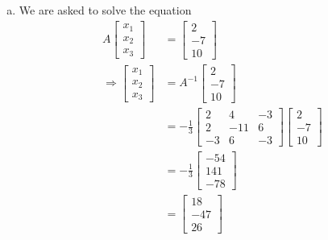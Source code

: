 \documentclass{article}
\begin{document}
\begin{enumerate}[(a)]
    \item We are asked to solve the equation 
    \begin{align*}
    A\begin{bmatrix}
        x_1\\x_2\\x_3
    \end{bmatrix} &= \begin{bmatrix}
        2\\-7\\10
    \end{bmatrix} \\
    \Rightarrow
    \begin{bmatrix}
        x_1\\x_2\\x_3
    \end{bmatrix} &= A^{-1}\begin{bmatrix}
        2\\-7\\10
    \end{bmatrix}
    \\
    &= -\frac{1}{3}\begin{bmatrix}
        2&4&-3 \\
        2&-11&6 \\
        -3&6&-3
    \end{bmatrix}\begin{bmatrix}
        2\\-7\\10
    \end{bmatrix}
    \\
    &= -\frac{1}{3}\begin{bmatrix}
        -54\\141\\-78
    \end{bmatrix}
    \\
    &= \begin{bmatrix}
        18\\-47\\26
    \end{bmatrix}
\end{align*}


\end{enumerate}
\end{document}
